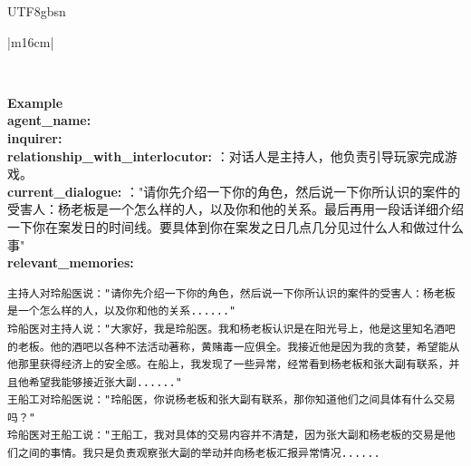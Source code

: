 \documentclass[11pt]{article}
\begin{document}
{\begin{CJK}{UTF8}{gbsn}
\begin{table}[ht!]
\begin{tabular}{|m{16cm}|}
\begin{minipage}[t]{\linewidth}
\begin{verbatim}
\end{verbatim}
\end{minipage} \\
\hline
{}  \textbf{Example}  \\
 \textbf{   agent\_name:} \\
\textbf{   inquirer:} \\
\textbf{   relationship\_with\_interlocutor:} ：对话人是主持人，他负责引导玩家完成游戏。 \\
\textbf{   current\_dialogue:} ："请你先介绍一下你的角色，然后说一下你所认识的案件的受害人：杨老板是一个怎么样的人，以及你和他的关系。最后再用一段话详细介绍一下你在案发日的时间线。要具体到你在案发之日几点几分见过什么人和做过什么事" \\

\textbf{   relevant\_memories:} \\
\begin{minipage}[t]{\linewidth}
\small\begin{verbatim}
主持人对玲船医说："请你先介绍一下你的角色，然后说一下你所认识的案件的受害人：杨老板是一个怎么样的人，以及你和他的关系......"
玲船医对主持人说："大家好，我是玲船医。我和杨老板认识是在阳光号上，他是这里知名酒吧的老板。他的酒吧以各种不法活动著称，黄赌毒一应俱全。我接近他是因为我的贪婪，希望能从他那里获得经济上的安全感。在船上，我发现了一些异常，经常看到杨老板和张大副有联系，并且他希望我能够接近张大副......"
王船工对玲船医说："玲船医，你说杨老板和张大副有联系，那你知道他们之间具体有什么交易吗？"
玲船医对王船工说："王船工，我对具体的交易内容并不清楚，因为张大副和杨老板的交易是他们之间的事情。我只是负责观察张大副的举动并向杨老板汇报异常情况......


\end{verbatim}
\end{minipage}
\end{tabular}
\end{table}
\end{CJK}}
\end{document}
